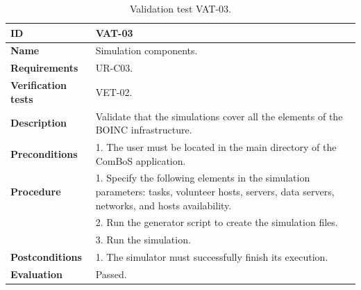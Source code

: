 \begin{center}
\begin{table}[htb]
\centering
\begin{tabular}{@{}p{2.5cm} p{13cm}@{}} 
\toprule
\textbf{ID} 					& VAT-03 \\
\midrule
\textbf{Name} 				& Simulation components. \\
\midrule
\textbf{Requirements} 		& UR-C03. \\
\midrule
\textbf{Verification tests} 	& VET-02. \\
\midrule
\textbf{Description} 		& Validate that the simulations cover all the elements of the BOINC infrastructure. \\
\midrule
\textbf{Preconditions}		&  1. The user must be located in the main directory of the ComBoS application. \\
\midrule
\textbf{Procedure}			& 1. Specify the following elements in the simulation parameters: tasks, volunteer hosts, servers, data servers, networks, and hosts availability. \\
							& 2. Run the generator script to create the simulation files. \\
							& 3. Run the simulation. \\ 
\midrule
\textbf{Postconditions} 		& 1. The simulator must successfully finish its execution. \\
\midrule
\textbf{Evaluation} 			& Passed. \\
\bottomrule
\end{tabular}
\caption{Validation test VAT-03.}
\label{tab:vat-03}
\end{table}
\end{center}


